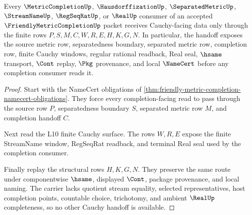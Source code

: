 \begin{theorem}
\label{thm:friendly-metric-completion-finite-cauchy-handoff}
Every $\MetricCompletionUp$, $\HausdorffizationUp$, $\SeparatedMetricUp$, $\StreamNameUp$, $\RegSeqRatUp$, or $\RealUp$ consumer of an accepted $\FriendlyMetricCompletionUp$ packet receives Cauchy-facing data only through the finite rows $P,S,M,C,W,R,E,H,K,G,N$. In particular, the handoff exposes the source metric row, separatedness boundary, separated metric row, completion row, finite Cauchy windows, regular rational readback, Real seal, $\hsame$ transport, $\Cont$ replay, $\Pkg$ provenance, and local $\NameCert$ before any completion consumer reads it.
\end{theorem}
\begin{proof}
Start with the NameCert obligations of \autoref{thm:friendly-metric-completion-namecert-obligations}. They force every completion-facing read to pass through the source row $P$, separatedness boundary $S$, separated metric row $M$, and completion handoff $C$.

Next read the L10 finite Cauchy surface. The rows $W,R,E$ expose the finite StreamName window, RegSeqRat readback, and terminal Real seal used by the completion consumer.

Finally replay the structural rows $H,K,G,N$. They preserve the same route under componentwise $\hsame$, displayed $\Cont$, package provenance, and local naming. The carrier lacks quotient stream equality, selected representatives, host completion points, countable choice, trichotomy, and ambient $\RealUp$ completeness, so no other Cauchy handoff is available.
\end{proof}




